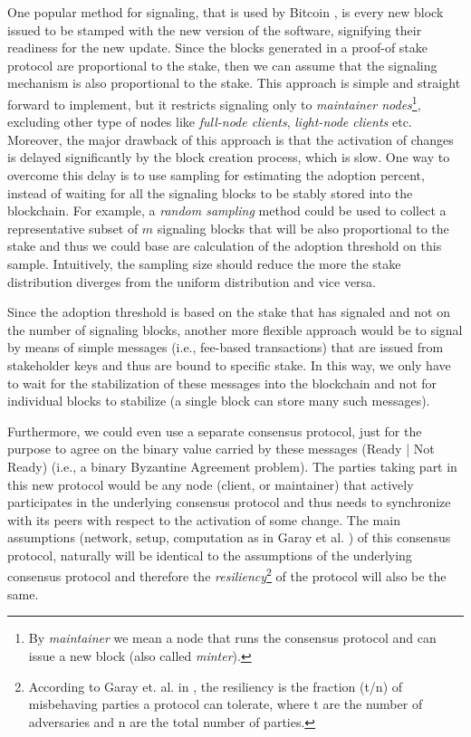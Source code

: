 One popular method for signaling, that is used by Bitcoin \cite{bitcoin}, is every new block issued to be stamped with the new version of the software, signifying their readiness for the new update. Since the blocks generated in a proof-of stake protocol are proportional to the stake, then we can assume that the signaling mechanism is also proportional to the stake. This approach is simple and straight forward to implement, but it restricts signaling only to \emph{maintainer nodes}\footnote{By \emph{maintainer} we mean a node that runs the consensus protocol and can issue a new block (also called \emph{minter}).}, excluding other type of nodes like \emph{full-node clients}, \emph{light-node clients} etc. Moreover, the major drawback of this approach is that the activation of changes is delayed significantly by the block creation process, which is slow.
 One way to overcome this delay is to use sampling for estimating the adoption percent, instead of waiting for all the signaling blocks to be stably stored into the blockchain. For example, a \emph{random sampling} method could be used to collect a representative subset of $m$ signaling blocks that will be also proportional to the stake and thus we could base are calculation of the adoption threshold on this sample. Intuitively, the sampling size should reduce the more the stake distribution diverges from the uniform distribution and vice versa.

Since the adoption threshold is based on the stake that has signaled and not on the number of signaling blocks, another more flexible approach would be to signal by means of simple messages (i.e., fee-based transactions) that are issued from stakeholder keys and thus are bound to specific stake. In this way, we only have to wait for the stabilization of these messages into the blockchain and not for individual blocks to stabilize (a single block can store many such messages).

Furthermore, we could even use a separate consensus protocol, just for the purpose to agree on the binary value carried by these messages (Ready | Not Ready) (i.e., a binary Byzantine Agreement problem). The parties taking part in this new protocol would be any node (client, or maintainer) that actively participates in the underlying consensus protocol and thus needs to synchronize with its peers with respect to the activation of some change. The main assumptions (network, setup, computation as in Garay et al. \cite{sok}) of this consensus protocol, naturally will be identical to the assumptions of the underlying consensus protocol and therefore the \emph{resiliency}\footnote{According to Garay et. al. in \cite{sok}, the resiliency is the fraction (t/n) of misbehaving parties a protocol can tolerate, where t are the number of adversaries and n are the total number of parties.} of the protocol will also be the same. 

